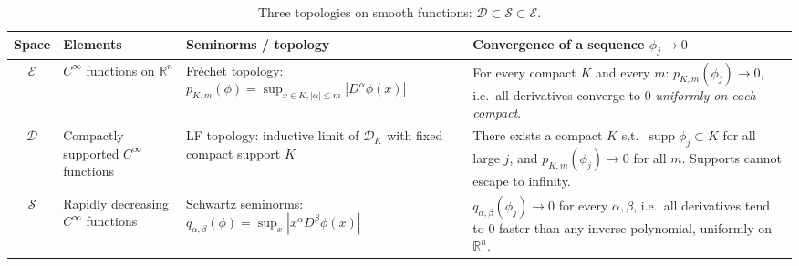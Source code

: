 \documentclass[12pt,a4paper]{article}
\theoremstyle{plain}
\theoremstyle{definition}
\theoremstyle{remark}
\theoremstyle{remark}
\begin{document}
\begin{table}[ht]
	\centering
	\renewcommand{\arraystretch}{1.3}
	\begin{tabular}{|c|p{}|p{}|p{}|}
		\hline
		Space & Elements & Seminorms / topology & Convergence of a sequence $\phi_j\to 0$ \\ \hline
		$\mathcal{E}$ &
		$C^\infty$ functions on $\mathbb{R}^n$ &
		Fréchet topology: $p_{K,m}(\phi) = 
		\sup_{x\in K,|\alpha|\le m}|D^\alpha\phi(x)|$ &
		For every compact $K$ and every $m$:
		$p_{K,m}(\phi_j)\to 0$, i.e.\ all derivatives
		converge to $0$ \emph{uniformly on each compact}. \\ \hline
		$\mathcal{D}$ &
		Compactly supported $C^\infty$ functions &
		LF topology: inductive limit of $\mathcal{D}_K$
		with fixed compact support $K$ &
		There exists a compact $K$ s.t.\ 
		$\operatorname{supp}\phi_j\subset K$ for all large $j$, and
		$p_{K,m}(\phi_j)\to 0$ for all $m$.  Supports cannot
		escape to infinity. \\ \hline
		$\mathcal{S}$ &
		Rapidly decreasing $C^\infty$ functions &
		Schwartz seminorms:
		$q_{\alpha,\beta}(\phi)=\sup_x|x^\alpha D^\beta\phi(x)|$ &
		$q_{\alpha,\beta}(\phi_j)\to 0$ for every
		$\alpha,\beta$, i.e.\ all derivatives tend to $0$
		faster than any inverse polynomial, uniformly on $\mathbb{R}^n$. \\ \hline
	\end{tabular}
	\caption{Three topologies on smooth functions: 
		$\mathcal{D}\subset\mathcal{S}\subset\mathcal{E}$.}
\end{table}
\end{document}
